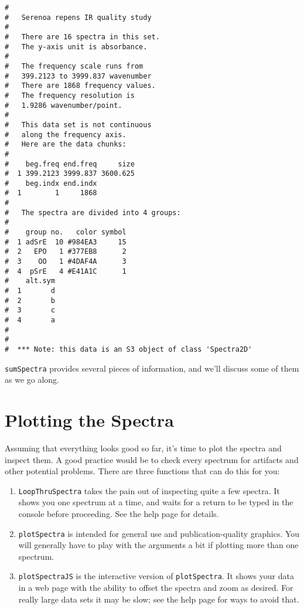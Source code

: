 \documentclass[letter,10pt,twocolumn,twoside,printwatermark=false]{pinp}
\begin{document}
\begin{ShadedResult}
\begin{verbatim}
#  
#   Serenoa repens IR quality study 
#  
#   There are 16 spectra in this set.
#   The y-axis unit is absorbance.
#  
#   The frequency scale runs from
#   399.2123 to 3999.837 wavenumber
#   There are 1868 frequency values.
#   The frequency resolution is
#   1.9286 wavenumber/point.
#  
#   This data set is not continuous
#   along the frequency axis.
#   Here are the data chunks:
#  
#    beg.freq end.freq     size
#  1 399.2123 3999.837 3600.625
#    beg.indx end.indx
#  1        1     1868
#  
#   The spectra are divided into 4 groups: 
#  
#    group no.   color symbol
#  1 adSrE  10 #984EA3     15
#  2   EPO   1 #377EB8      2
#  3    OO   1 #4DAF4A      3
#  4  pSrE   4 #E41A1C      1
#    alt.sym
#  1       d
#  2       b
#  3       c
#  4       a
#  
#  
#  *** Note: this data is an S3 object of class 'Spectra2D'
\end{verbatim}
\end{ShadedResult}

\texttt{sumSpectra} provides several pieces of information, and we'll
discuss some of them as we go along.

\hypertarget{plotting-the-spectra}{%
\section{Plotting the Spectra}\label{plotting-the-spectra}}

Assuming that everything looks good so far, it's time to plot the
spectra and inspect them. A good practice would be to check every
spectrum for artifacts and other potential problems. There are three
functions that can do this for you:

\begin{enumerate}
  \item \texttt{LoopThruSpectra} takes the pain out of inspecting quite a few spectra.  It shows you one spectrum at a time, and waits for a return to be typed in the console before proceeding.  See the help page for details.
  \item \texttt{plotSpectra} is intended for general use and publication-quality graphics.  You will generally have to play with the arguments a bit if plotting more than one spectrum.
  \item \texttt{plotSpectraJS} is the interactive version of \texttt{plotSpectra}.  It shows your data in a web page with the ability to offset the spectra and zoom as desired.  For really large data sets it may be slow; see the help page for ways to avoid that.
\end{enumerate}
\end{document}
